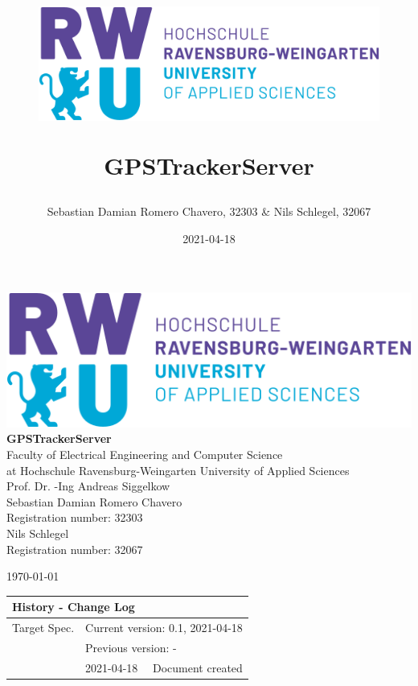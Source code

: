 \documentclass[12pt,a4paper]{book}
\title{
	\textbf{} \\
	\begin{figure}[h]
		\centering
		\includegraphics[scale=0.4]{png/rwu.png}
	\end{figure}
  GPSTrackerServer
}
\author{Sebastian Damian Romero Chavero, 32303 \& Nils Schlegel, 32067}
\date{2021-04-18}
\begin{document}
\begin{titlepage}
  \centering

  \includegraphics[scale=0.5]{png/rwu.png} \\
  \vspace{3cm}
  {\huge\bfseries GPSTrackerServer} \\
  \vspace{3cm}
  {\large Faculty of Electrical Engineering and Computer Science \\
  at Hochschule Ravensburg-Weingarten University of Applied Sciences} \\
  \vspace{1cm}
  Prof. Dr. -Ing Andreas Siggelkow \\
  \vspace{3cm}
  {\large Sebastian Damian Romero Chavero} \\
  {\small Registration number: 32303} \\
  \vspace{1cm}
  {\large Nils Schlegel} \\
  {\small Registration number: 32067} \\
  \vfill
  {\large \today\par}
\end{titlepage}

\newpage
\thispagestyle{empty}
\quad
\newpage

\setcounter{page}{1}
\begin{center}
	\begin{tabular}{llr}
		\multicolumn{3}{l}{\textbf{History - Change Log}} \\
		\hline
		Target Spec. & \multicolumn{2}{l}{Current version: 0.1, 2021-04-18} \\
		& \multicolumn{2}{l}{Previous version: -} \\
		\hline
		&	2021-04-18 & Document created
	\end{tabular}
\end{center}

\newpage

\tableofcontents

\newpage



\newpage
\end{document}

